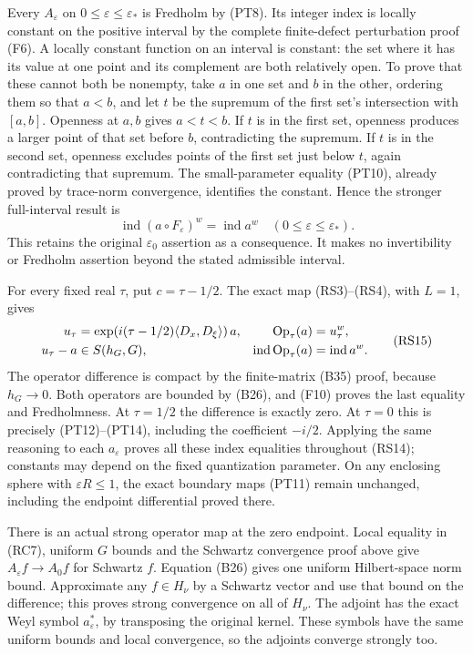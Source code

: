 \documentclass[
  11pt,
]{article}
\begin{document}
Every \(A_\varepsilon\) on \(0\leq\varepsilon\leq\varepsilon_*\) is
Fredholm by (PT8). Its integer index is locally constant on the positive
interval by the complete finite-defect perturbation proof (F6). A
locally constant function on an interval is constant: the set where it
has its value at one point and its complement are both relatively open.
To prove that these cannot both be nonempty, take \(a\) in one set and
\(b\) in the other, ordering them so that \(a<b\), and let \(t\) be the
supremum of the first set's intersection with \([a,b]\). Openness at
\(a,b\) gives \(a<t<b\). If \(t\) is in the first set, openness produces
a larger point of that set before \(b\), contradicting the supremum. If
\(t\) is in the second set, openness excludes points of the first set
just below \(t\), again contradicting that supremum. The small-parameter
equality (PT10), already proved by trace-norm convergence, identifies
the constant. Hence the stronger full-interval result is \[
 \operatorname{ind}(a\circ F_\varepsilon)^w
     =\operatorname{ind}a^w
          \quad(0\leq\varepsilon\leq\varepsilon_*).
 \tag{RS14}
\] This retains the original \(\varepsilon_0\) assertion as a
consequence. It makes no invertibility or Fredholm assertion beyond the
stated admissible interval.

For every fixed real \(\tau\), put \(c=\tau-1/2\). The exact map
(RS3)--(RS4), with \(L=1\), gives {\small\let\split\aligned\let\endsplit\endaligned
\[
 \begin{split}
 u_\tau&=\exp\!\left(i(\tau-1/2)\langle D_x,D_\xi\rangle\right)a,
 &\operatorname{Op}_\tau(a)&=u_\tau^w,\\
 u_\tau-a&\in S(h_G,G),
 &\operatorname{ind}\operatorname{Op}_\tau(a)
     &=\operatorname{ind}a^w .
 \end{split}
 \tag{RS15}
\]
} The operator difference is compact by the finite-matrix (B35) proof,
because \(h_G\to0\). Both operators are bounded by (B26), and (F10)
proves the last equality and Fredholmness. At \(\tau=1/2\) the
difference is exactly zero. At \(\tau=0\) this is precisely
(PT12)--(PT14), including the coefficient \(-i/2\). Applying the same
reasoning to each \(a_\varepsilon\) proves all these index equalities
throughout (RS14); constants may depend on the fixed quantization
parameter. On any enclosing sphere with \(\varepsilon R\leq1\), the
exact boundary maps (PT11) remain unchanged, including the endpoint
differential proved there.

There is an actual strong operator map at the zero endpoint. Local
equality in (RC7), uniform \(G\) bounds and the Schwartz convergence
proof above give \(A_\varepsilon f\to A_0f\) for Schwartz \(f\).
Equation (B26) gives one uniform Hilbert-space norm bound. Approximate
any \(f\in H_\nu\) by a Schwartz vector and use that bound on the
difference; this proves strong convergence on all of \(H_\nu\). The
adjoint has the exact Weyl symbol \(a_\varepsilon^*\), by transposing
the original kernel. These symbols have the same uniform bounds and
local convergence, so the adjoints converge strongly too.
\end{document}
